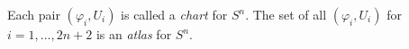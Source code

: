 Each pair $(\varphi_i, U_i)$ is called a \textit{chart} for $S^n$. The set of all $(\varphi_i, U_i)$ for $i = 1, \ldots, 2n+2$ is an \textit{atlas} for $S^n$.
